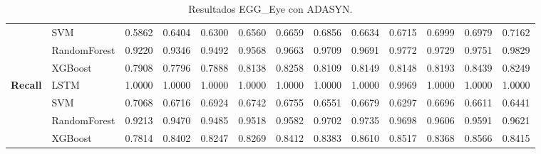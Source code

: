 \begin{table}[h]
\begin{adjustbox}{max width=15cm}
\begin{tabular}{|c|l|r|r|r|r|r|r|r|r|r|r|r|}
			& SVM &  0.5862 &  0.6404 &  0.6300 &  0.6560 &  0.6659 &  0.6856 &  0.6634 &  0.6715 &  0.6999 &  0.6979 &  0.7162 \\
			& RandomForest &  0.9220 &  0.9346 &  0.9492 &  0.9568 &  0.9663 &  0.9709 &  0.9691 &  0.9772 &  0.9729 &  0.9751 &  0.9829 \\
			& XGBoost &  0.7908 &  0.7796 &  0.7888 &  0.8138 &  0.8258 &  0.8109 &  0.8149 &  0.8148 &  0.8193 &  0.8439 &  0.8249 \\
			\hline
			\textbf{Recall} & LSTM &  1.0000 &  1.0000 &  1.0000 &  1.0000 &  1.0000 &  1.0000 &  1.0000 &  0.9969 &  1.0000 &  1.0000 &  1.0000 \\
			& SVM &  0.7068 &  0.6716 &  0.6924 &  0.6742 &  0.6755 &  0.6551 &  0.6679 &  0.6297 &  0.6696 &  0.6611 &  0.6441 \\
			& RandomForest &  0.9213 &  0.9470 &  0.9485 &  0.9518 &  0.9582 &  0.9702 &  0.9735 &  0.9698 &  0.9606 &  0.9591 &  0.9621 \\
			& XGBoost &  0.7814 &  0.8402 &  0.8247 &  0.8269 &  0.8412 &  0.8383 &  0.8610 &  0.8517 &  0.8368 &  0.8566 &  0.8415 \\
			\hline
		\end{tabular}
	\end{adjustbox}
	\caption{Resultados EGG\_Eye con ADASYN.}
	\label{tab:EGGEyeADASYN}
\end{table}
